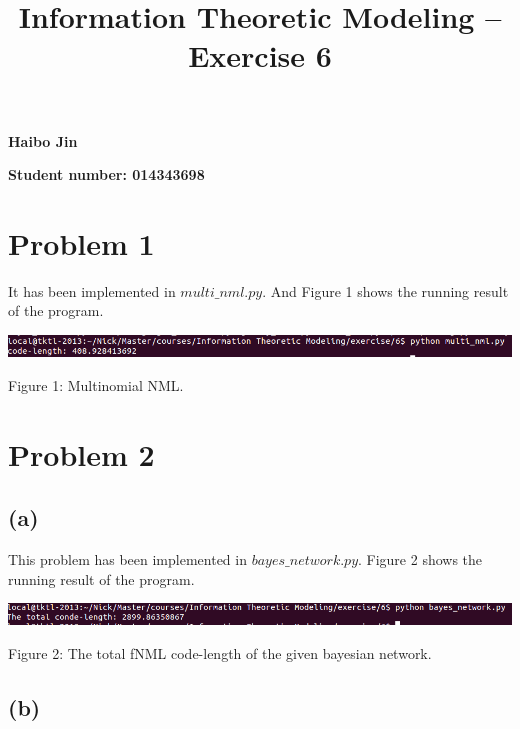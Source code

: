 \documentclass{article}
\title{Information Theoretic Modeling -- Exercise 6}
\date{}
\begin{document}
\maketitle

{\centering \large \textbf{Haibo Jin}}

{\centering \large \textbf{Student number: 014343698}}

\section{Problem 1}

It has been implemented in \emph{$multi\_nml.py$}. And Figure 1 shows the running result of the program.

\vspace{5mm}
\begin{minipage}{0.9\textwidth}
  \includegraphics[width=1.1\textwidth,keepaspectratio]{1.png}
  \centerline{Figure 1: Multinomial NML.}
\end{minipage}
\vspace{5mm}




\section{Problem 2}

\subsection*{(a)}

This problem has been implemented in \emph{$bayes\_network.py$}. Figure 2 shows the running result of the program.

\vspace{5mm}
\begin{minipage}{0.9\textwidth}
  \includegraphics[width=1.1\textwidth,keepaspectratio]{2.png}
  \centerline{Figure 2: The total fNML code-length of the given bayesian network.}
\end{minipage}
\vspace{5mm}

\subsection*{(b)}
\end{document}

